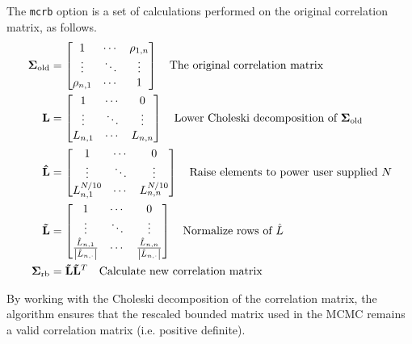 \documentclass{article}\usepackage[]{graphicx}\usepackage[]{color}
\begin{document}
The \texttt{mcrb} option is a set of calculations performed
on the original correlation matrix, as follows.
\begin{align*}
  \mathbf{\Sigma_{\text{old}}}&=
  \begin{bmatrix}
    1 & \cdots & \rho_{1,n}\\
    \vdots & \ddots & \vdots\\
    \rho_{n,1} & \cdots & 1
  \end{bmatrix}
  \quad\text{The original correlation matrix}\\
  \mathbf{L}&=\begin{bmatrix}
    1 & \cdots & 0\\
    \vdots & \ddots & \vdots\\
    L_{n,1} & \cdots & L_{n,n}
  \end{bmatrix}
  \quad\text{Lower Choleski decomposition of $ \mathbf{\Sigma_{\text{old}}}$}\\
  \mathbf{\hat{L}}&=\begin{bmatrix}
    1 & \cdots & 0\\
    \vdots & \ddots & \vdots\\
    L_{n,1}^{N/10} & \cdots & L_{n,n}^{N/10}
  \end{bmatrix}
  \quad\text{Raise elements to power user supplied $N$}\\
  \mathbf{\tilde{L}}&=\begin{bmatrix}
    1 & \cdots & 0\\
    \vdots & \ddots & \vdots\\
    \frac{\hat{L}_{n,1}}{\left | \hat{L}_{n,\cdot}\right |} & \cdots &
    \frac{\hat{L}_{n,n}}{\left | \hat{L}_{n,\cdot}\right |}
  \end{bmatrix}
  \quad\text{Normalize rows of $\hat{L}$ }\\
  \mathbf{\Sigma_{\text{rb}}}&=\mathbf{\tilde{L}}\mathbf{\tilde{L}}^T
  \quad\text{Calculate new correlation matrix}
\end{align*}

By working with the Choleski decomposition of the
correlation matrix, the algorithm ensures that the rescaled
bounded matrix used in the MCMC remains a valid correlation
matrix (i.e. positive definite).
\end{document}
